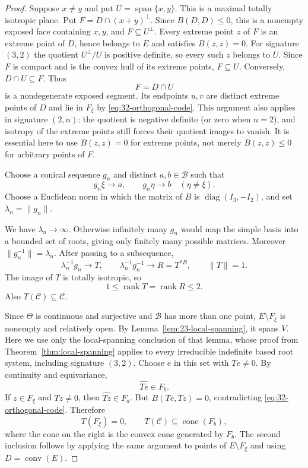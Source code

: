 \documentclass[11pt,reqno]{amsart}
\theoremstyle{plain}
\theoremstyle{definition}
\theoremstyle{remark}
\numberwithin{equation}{section}
\begin{document}
\begin{proof}
Suppose $x\ne y$ and put $U=\operatorname{span}\{x,y\}$.
This is a maximal totally isotropic plane.
Put $F=D\cap(x+y)^\perp$. Since $B(D,D)\leq0$, this is a nonempty exposed face containing $x,y$, and $F\subseteq U^\perp$. Every extreme point $z$ of $F$ is an extreme point of $D$, hence belongs to $E$ and satisfies $B(z,z)=0$.
For signature $(3,2)$ the quotient $U^\perp/U$ is positive definite, so every such $z$ belongs to $U$. Since $F$ is compact and is the convex hull of its extreme points, $F\subseteq U$. Conversely, $D\cap U\subseteq F$. Thus
\[
 F=D\cap U
\]
is a nondegenerate exposed segment. Its endpoints $u,v$ are distinct extreme points of $D$ and lie in $F_\xi$ by \eqref{eq:32-orthogonal-code}.
This argument also applies in signature $(2,n)$: the quotient is negative definite (or zero when $n=2$), and isotropy of the extreme points still forces their quotient images to vanish. It is essential here to use $B(z,z)=0$ for extreme points, not merely $B(z,z)\leq0$ for arbitrary points of $F$.

Choose a conical sequence $g_n$ and distinct
$a,b\in\mathcal B$ such that
\begin{equation}\label{eq:32-conical-sequence}
    g_n\xi\to a,\qquad
    g_n\eta\to b\quad(\eta\ne\xi).
\end{equation}
Choose a Euclidean norm in which the matrix of $B$ is
$\operatorname{diag}(I_3,-I_2)$, and set
$\lambda_n=\|g_n\|$.

We have $\lambda_n\to\infty$.
Otherwise infinitely many $g_n$ would map the simple basis
into a bounded set of roots, giving only finitely many
possible matrices.
Moreover $\|g_n^{-1}\|=\lambda_n$.
After passing to a subsequence,
\[
    \lambda_n^{-1}g_n\to T,\qquad
    \lambda_n^{-1}g_n^{-1}\to R=T^{*B},
    \qquad \|T\|=1.
\]
The image of $T$ is totally isotropic, so
\begin{equation}\label{eq:32-rank-bound}
    1\leq\operatorname{rank}T
      =\operatorname{rank}R\leq2.
\end{equation}
Also $T(\mathcal C)\subseteq\mathcal C$.

Since $\Theta$ is continuous and surjective and $\mathcal B$ has
more than one point, $E\setminus F_\xi$ is nonempty and relatively open.
By Lemma~\ref{lem:23-local-spanning}, it spans $V$.
Here we use only the local-spanning conclusion of that lemma,
whose proof from Theorem~\ref{thm:local-spanning} applies to every
irreducible indefinite based root system, including signature $(3,2)$.
Choose $e$ in this set with $Te\ne0$.
By continuity and equivariance,
\[
    \widehat{Te}\in F_b.
\]
If $z\in F_\xi$ and $Tz\ne0$, then
$\widehat{Tz}\in F_a$.
But $B(Te,Tz)=0$, contradicting
\eqref{eq:32-orthogonal-code}.
Therefore
\begin{equation}\label{eq:32-T-image}
    T(F_\xi)=0,\qquad
    T(\mathcal C)\subseteq\operatorname{cone}(F_b),
\end{equation}
where the cone on the right is the convex cone generated
by $F_b$.
The second inclusion follows by applying the same argument
to points of $E\setminus F_\xi$ and using
$D=\operatorname{conv}(E)$.


\end{proof}
\end{document}
